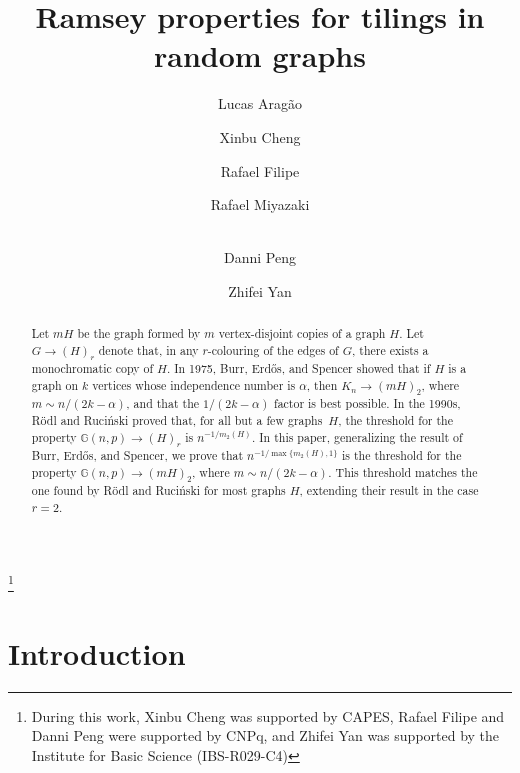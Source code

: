 \documentclass[a4paper,reqno,11pt]{amsart}
\theoremstyle{definition}
\theoremstyle{remark}
\renewcommand\to{\rightarrow}
\begin{document}
\normalem

\title{Ramsey properties for tilings in random graphs}
\author{Lucas Arag\~ao \and Xinbu Cheng \and Rafael Filipe \and Rafael Miyazaki\and \\Danni Peng \and Zhifei Yan}

\address{Departamento de Matemática Aplicada, Instituto de Matemática, Universidade Federal do Rio de Janeiro, Rio de Janeiro, 21941-909, Brasil}

\address{IMPA, Estrada Dona Castorina 110, Jardim Bot\^anico, Rio de Janeiro, 22460-320, Brasil}

\address{Department of Mathematics, Emory University, Atlanta, GA, 30322, USA}

\address{ECOPRO, Institute for Basic Science, 55 Expo-ro, Yuseong-gu, Daejeon, 34126, Korea}

\thanks{During this work, Xinbu Cheng was supported by CAPES, Rafael Filipe and Danni Peng were supported by CNPq, and Zhifei Yan was supported by the Institute for Basic Science (IBS-R029-C4)}

\begin{abstract}
Let $mH$ be the graph formed by $m$ vertex-disjoint copies of a graph $H$. Let $G \to (H)_r$ denote that, in any $r$-colouring of the edges of $G$, there exists a monochromatic copy of $H$. In 1975, Burr, Erd\H{o}s, and Spencer showed that if $H$ is a graph on $k$ vertices whose independence number is $\alpha$, then $K_n \to (mH)_2$, where $m\sim n/(2k-\alpha)$, and that the $1/(2k-\alpha)$ factor is best possible. In the 1990s, R\"{o}dl and Ruci\'{n}ski proved that, for all but a few graphs~$H$, the threshold for the property $\mathbb{G}(n,p) \to (H)_r$ is $n^{-1/m_2(H)}$. In this paper, generalizing the result of Burr, Erd\H{o}s, and Spencer, we prove that $n^{-1/\max\{m_2(H),1\}}$ is the threshold for the property $\mathbb{G}(n,p) \to (mH)_2$, where $m\sim n/(2k-\alpha)$. This threshold matches the one found by R\"{o}dl and Ruci\'nski for most graphs $H$, extending their result in the case $r=2$.
\end{abstract}

\maketitle
\section{Introduction}
\end{document}
